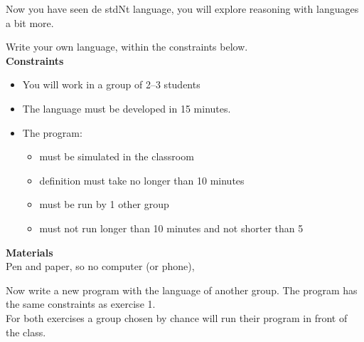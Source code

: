\documentclass[11pt, a4paper]{article}
\begin{document}
\setcounter{opgave}{1}
Now you have seen de stdNt language, you will explore reasoning with languages a bit more.

Write your own language, within the constraints below. 
\\

\textbf{Constraints}\\
\begin{itemize}
    \item You will work in a group of 2--3 students
    \item The language must be developed in 15 minutes. 
    \item The program:
    
    \begin{itemize}
        \item must be simulated in the classroom
        \item definition must take no longer than 10 minutes
        \item must be run by 1 other group
        \item must not run longer than 10 minutes and not shorter than 5
    \end{itemize}
\end{itemize}

\textbf{Materials}\\
Pen and paper, so no computer (or phone), 

Now write a new program with the language of another group. The program has the same constraints as exercise 1.\\

For both exercises a group chosen by chance will run their program in front of the class.
\einde
\end{document}
